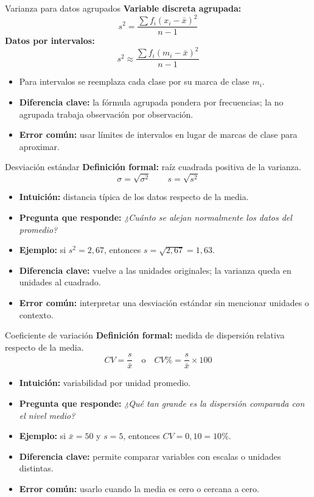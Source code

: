 \documentclass[aspectratio=169,11pt]{beamer}
\newcommand{\pregunta}[1]{\textbf{Pregunta que responde:} \emph{#1}}
\newcommand{\errorcomun}[1]{\textbf{Error común:} #1}
\newcommand{\diferencia}[1]{\textbf{Diferencia clave:} #1}
\begin{document}
\begin{frame}{Varianza para datos agrupados}
\textbf{Variable discreta agrupada:}
\[
s^2=\frac{\sum f_i(x_i-\bar{x})^2}{n-1}
\]
\textbf{Datos por intervalos:}
\[
s^2\approx\frac{\sum f_i(m_i-\bar{x})^2}{n-1}
\]
\begin{itemize}
  \item Para intervalos se reemplaza cada clase por su marca de clase $m_i$.
  \item \diferencia{la fórmula agrupada pondera por frecuencias; la no agrupada trabaja observación por observación.}
  \item \errorcomun{usar límites de intervalos en lugar de marcas de clase para aproximar.}
\end{itemize}
\end{frame}

\begin{frame}{Desviación estándar}
\textbf{Definición formal:} raíz cuadrada positiva de la varianza.
\[
\sigma=\sqrt{\sigma^2}\qquad s=\sqrt{s^2}
\]
\begin{itemize}
  \item \textbf{Intuición:} distancia típica de los datos respecto de la media.
  \item \pregunta{¿Cuánto se alejan normalmente los datos del promedio?}
  \item \textbf{Ejemplo:} si $s^2=2{,}67$, entonces $s=\sqrt{2{,}67}=1{,}63$.
  \item \diferencia{vuelve a las unidades originales; la varianza queda en unidades al cuadrado.}
  \item \errorcomun{interpretar una desviación estándar sin mencionar unidades o contexto.}
\end{itemize}
\end{frame}

\begin{frame}{Coeficiente de variación}
\textbf{Definición formal:} medida de dispersión relativa respecto de la media.
\[
CV=\frac{s}{\bar{x}}\quad\text{o}\quad CV\%=\frac{s}{\bar{x}}\times 100
\]
\begin{itemize}
  \item \textbf{Intuición:} variabilidad por unidad promedio.
  \item \pregunta{¿Qué tan grande es la dispersión comparada con el nivel medio?}
  \item \textbf{Ejemplo:} si $\bar{x}=50$ y $s=5$, entonces $CV=0{,}10=10\%$.
  \item \diferencia{permite comparar variables con escalas o unidades distintas.}
  \item \errorcomun{usarlo cuando la media es cero o cercana a cero.}
\end{itemize}
\end{frame}
\end{document}

